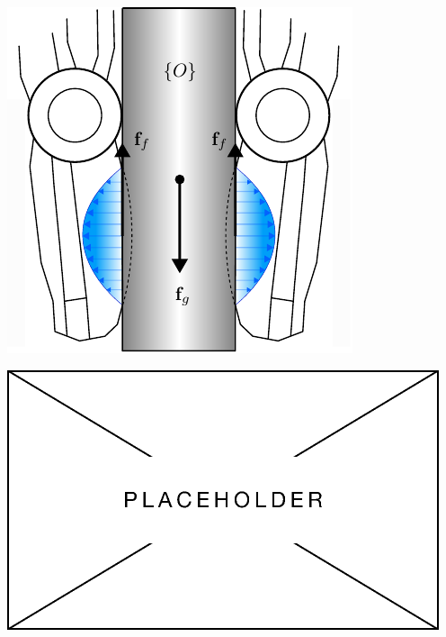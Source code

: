 \begin{center}
    \renewcommand{\arraystretch}{1.2}
    \begin{minipage}{.48\linewidth}
        \vspace{0pt}
        \centering
        \includegraphics[width=.95\textwidth]{chapters/modeling/fig/contact-friction-model.pdf}
    \end{minipage}%
    \hfill%
    \begin{minipage}{.48\linewidth}
        \vspace{0pt}
        \centering
        \includegraphics[width=.95\textwidth]{img/placeholder.png}
    \end{minipage}%
    \vspace{15pt}

\end{center}
